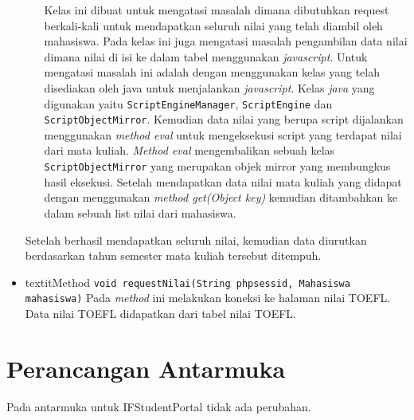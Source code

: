 \begin{itemize}
\begin{itemize}
		Kelas ini dibuat untuk mengatasi masalah dimana dibutuhkan request berkali-kali untuk mendapatkan seluruh nilai yang telah diambil oleh mahasiswa. Pada kelas ini juga mengatasi masalah pengambilan data nilai dimana nilai di isi ke dalam tabel menggunakan \textit{javascript}. Untuk mengatasi masalah ini adalah dengan menggunakan kelas yang telah disediakan oleh java untuk menjalankan \textit{javascript}. Kelas \textit{java} yang digunakan yaitu \texttt{ScriptEngineManager}, \texttt{ScriptEngine} dan \texttt{ScriptObjectMirror}. Kemudian data nilai yang berupa script dijalankan menggunakan \textit{method eval} untuk mengeksekusi script yang terdapat nilai dari mata kuliah. \textit{Method eval} mengembalikan sebuah kelas \texttt{ScriptObjectMirror} yang merupakan objek mirror yang membungkus hasil eksekusi. Setelah mendapatkan data nilai mata kuliah yang didapat dengan menggunakan \textit{method get(Object key)} kemudian ditambahkan ke dalam sebuah list nilai dari mahasiswa.
	\end{itemize}
	Setelah berhasil mendapatkan seluruh nilai, kemudian data diurutkan berdasarkan tahun semester mata kuliah tersebut ditempuh.
	\item textit{Method} \texttt{void requestNilai(String phpsessid, Mahasiswa mahasiswa)}
	Pada \textit{method} ini melakukan koneksi ke halaman nilai TOEFL. Data nilai TOEFL didapatkan dari tabel nilai TOEFL.
\end{itemize}

\section{Perancangan Antarmuka}
Pada antarmuka untuk IFStudentPortal tidak ada perubahan.